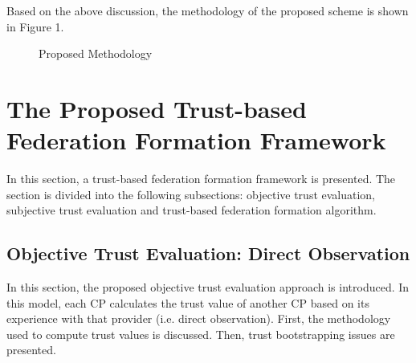 \documentclass[preprint]{elsarticle}
\theoremstyle{definition}
\theoremstyle{remark}
\theoremstyle{property}
\begin{document}
Based on the above discussion, the methodology of the proposed scheme is shown in Figure 1.

\vspace{2mm}
\begin{figure}[!ht]

\centering
{}
\label{fig1}
\caption{Proposed Methodology}
\end{figure}

\vspace{2mm}

\section{The Proposed Trust-based Federation Formation Framework}

In this section, a trust-based federation formation framework is presented. The section is divided into the following subsections: objective trust evaluation, subjective trust evaluation and trust-based federation formation algorithm.


\subsection{Objective Trust Evaluation: Direct Observation}

In this section, the proposed objective trust
evaluation approach is introduced. In this model, each CP calculates
the trust value of another CP based on its experience with that provider (i.e. direct observation). First, the methodology used to compute trust values is discussed. Then, trust bootstrapping issues are presented.

\end{document}
